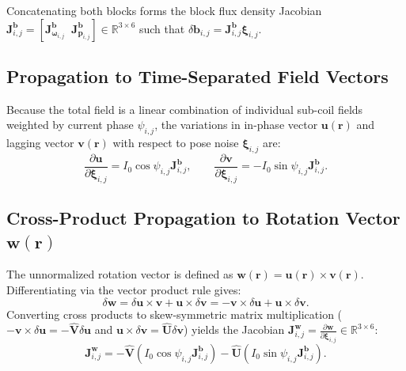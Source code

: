 \documentclass[11pt, a4paper]{article}
\begin{document}
Concatenating both blocks forms the block flux density Jacobian $\mathbf{J}_{i,j}^{\mathbf{b}} = [\mathbf{J}_{\boldsymbol{\omega}_{i,j}}^{\mathbf{b}} \;\; \mathbf{J}_{\mathbf{p}_{i,j}}^{\mathbf{b}}] \in \mathbb{R}^{3 \times 6}$ such that $\delta \mathbf{b}_{i,j} = \mathbf{J}_{i,j}^{\mathbf{b}} \boldsymbol{\xi}_{i,j}$.

\subsection{Propagation to Time-Separated Field Vectors}
Because the total field is a linear combination of individual sub-coil fields weighted by current phase $\psi_{i,j}$, the variations in in-phase vector $\mathbf{u}(\mathbf{r})$ and lagging vector $\mathbf{v}(\mathbf{r})$ with respect to pose noise $\boldsymbol{\xi}_{i,j}$ are:
\begin{equation}
    \frac{\partial \mathbf{u}}{\partial \boldsymbol{\xi}_{i,j}} = I_0 \cos\psi_{i,j} \mathbf{J}_{i,j}^{\mathbf{b}}, \qquad \frac{\partial \mathbf{v}}{\partial \boldsymbol{\xi}_{i,j}} = -I_0 \sin\psi_{i,j} \mathbf{J}_{i,j}^{\mathbf{b}}.
\end{equation}

\subsection{Cross-Product Propagation to Rotation Vector $\mathbf{w}(\mathbf{r})$}
The unnormalized rotation vector is defined as $\mathbf{w}(\mathbf{r}) = \mathbf{u}(\mathbf{r}) \times \mathbf{v}(\mathbf{r})$. Differentiating via the vector product rule gives:
\begin{equation}
    \delta \mathbf{w} = \delta \mathbf{u} \times \mathbf{v} + \mathbf{u} \times \delta \mathbf{v} = -\mathbf{v} \times \delta \mathbf{u} + \mathbf{u} \times \delta \mathbf{v}.
\end{equation}
Converting cross products to skew-symmetric matrix multiplication ($-\mathbf{v} \times \delta \mathbf{u} = -\hat{\mathbf{V}} \delta \mathbf{u}$ and $\mathbf{u} \times \delta \mathbf{v} = \hat{\mathbf{U}} \delta \mathbf{v}$) yields the Jacobian $\mathbf{J}_{i,j}^{\mathbf{w}} = \frac{\partial \mathbf{w}}{\partial \boldsymbol{\xi}_{i,j}} \in \mathbb{R}^{3 \times 6}$:
\begin{equation}
    \mathbf{J}_{i,j}^{\mathbf{w}} = -\hat{\mathbf{V}} \left( I_0 \cos\psi_{i,j} \mathbf{J}_{i,j}^{\mathbf{b}} \right) - \hat{\mathbf{U}} \left( I_0 \sin\psi_{i,j} \mathbf{J}_{i,j}^{\mathbf{b}} \right).
\end{equation}
\end{document}
